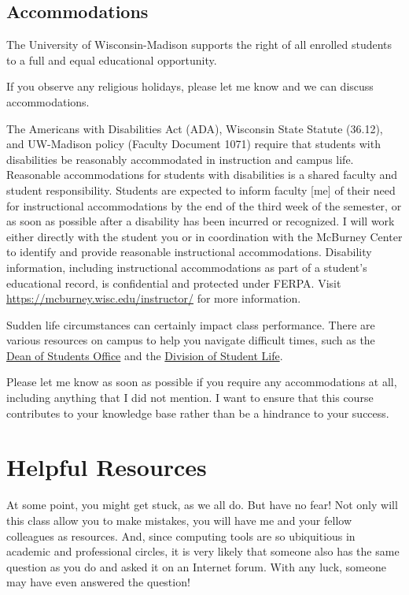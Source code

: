 \documentclass[11pt,]{article}
\begin{document}
\hypertarget{accommodations}{%
\subsection{Accommodations}\label{accommodations}}

The University of Wisconsin-Madison supports the right of all enrolled
students to a full and equal educational opportunity.

If you observe any religious holidays, please let me know and we can
discuss accommodations.

The Americans with Disabilities Act (ADA), Wisconsin State Statute
(36.12), and UW-Madison policy (Faculty Document 1071) require that
students with disabilities be reasonably accommodated in instruction and
campus life. Reasonable accommodations for students with disabilities is
a shared faculty and student responsibility. Students are expected to
inform faculty {[}me{]} of their need for instructional accommodations
by the end of the third week of the semester, or as soon as possible
after a disability has been incurred or recognized. I will work either
directly with the student you or in coordination with the McBurney
Center to identify and provide reasonable instructional accommodations.
Disability information, including instructional accommodations as part
of a student's educational record, is confidential and protected under
FERPA. Visit \url{https://mcburney.wisc.edu/instructor/} for more
information.

Sudden life circumstances can certainly impact class performance. There
are various resources on campus to help you navigate difficult times,
such as the \href{https://doso.students.wisc.edu/}{Dean of Students
Office} and the \href{https://students.wisc.edu/}{Division of Student
Life}.

Please let me know as soon as possible if you require any accommodations
at all, including anything that I did not mention. I want to ensure that
this course contributes to your knowledge base rather than be a
hindrance to your success.

\hypertarget{helpful-resources}{%
\section{Helpful Resources}\label{helpful-resources}}

At some point, you might get stuck, as we all do. But have no fear! Not
only will this class allow you to make mistakes, you will have me and
your fellow colleagues as resources. And, since computing tools are so
ubiquitious in academic and professional circles, it is very likely that
someone also has the same question as you do and asked it on an Internet
forum. With any luck, someone may have even answered the question!
\end{document}
